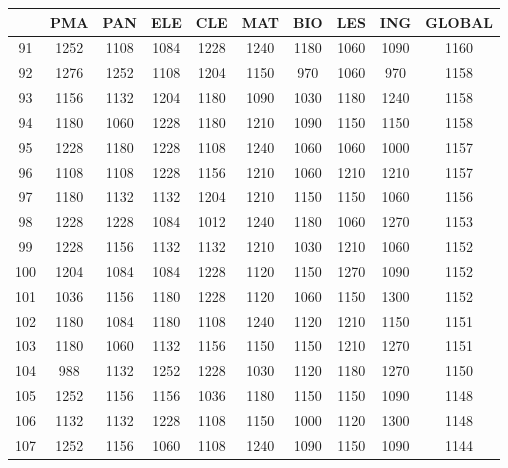 \documentclass{article}
\begin{document}
\begin{table}
\centering
\begin{tabular}{c|c|c|c|c|c|c|c|c|c|}
\cline{2-10}
& \textbf{PMA} & \textbf{PAN} & \textbf{ELE} & \textbf{CLE} & \textbf{MAT} & \textbf{BIO} & \textbf{LES} & \textbf{ING} & \textbf{GLOBAL} \\ \hline
\multicolumn{1}{|c|}{91}  & 1252 & 1108 & 1084 & 1228 & 1240 & 1180 & 1060 & 1090 & 1160 \\ \hline
\multicolumn{1}{|c|}{92}  & 1276 & 1252 & 1108 & 1204 & 1150 & 970  & 1060 & 970  & 1158 \\ \hline
\multicolumn{1}{|c|}{93}  & 1156 & 1132 & 1204 & 1180 & 1090 & 1030 & 1180 & 1240 & 1158 \\ \hline
\multicolumn{1}{|c|}{94}  & 1180 & 1060 & 1228 & 1180 & 1210 & 1090 & 1150 & 1150 & 1158 \\ \hline
\multicolumn{1}{|c|}{95}  & 1228 & 1180 & 1228 & 1108 & 1240 & 1060 & 1060 & 1000 & 1157 \\ \hline
\multicolumn{1}{|c|}{96}  & 1108 & 1108 & 1228 & 1156 & 1210 & 1060 & 1210 & 1210 & 1157 \\ \hline
\multicolumn{1}{|c|}{97}  & 1180 & 1132 & 1132 & 1204 & 1210 & 1150 & 1150 & 1060 & 1156 \\ \hline
\multicolumn{1}{|c|}{98}  & 1228 & 1228 & 1084 & 1012 & 1240 & 1180 & 1060 & 1270 & 1153 \\ \hline
\multicolumn{1}{|c|}{99}  & 1228 & 1156 & 1132 & 1132 & 1210 & 1030 & 1210 & 1060 & 1152 \\ \hline
\multicolumn{1}{|c|}{100} & 1204 & 1084 & 1084 & 1228 & 1120 & 1150 & 1270 & 1090 & 1152 \\ \hline
\multicolumn{1}{|c|}{101} & 1036 & 1156 & 1180 & 1228 & 1120 & 1060 & 1150 & 1300 & 1152 \\ \hline
\multicolumn{1}{|c|}{102} & 1180 & 1084 & 1180 & 1108 & 1240 & 1120 & 1210 & 1150 & 1151 \\ \hline
\multicolumn{1}{|c|}{103} & 1180 & 1060 & 1132 & 1156 & 1150 & 1150 & 1210 & 1270 & 1151 \\ \hline
\multicolumn{1}{|c|}{104} & 988  & 1132 & 1252 & 1228 & 1030 & 1120 & 1180 & 1270 & 1150 \\ \hline
\multicolumn{1}{|c|}{105} & 1252 & 1156 & 1156 & 1036 & 1180 & 1150 & 1150 & 1090 & 1148 \\ \hline
\multicolumn{1}{|c|}{106} & 1132 & 1132 & 1228 & 1108 & 1150 & 1000 & 1120 & 1300 & 1148 \\ \hline
\multicolumn{1}{|c|}{107} & 1252 & 1156 & 1060 & 1108 & 1240 & 1090 & 1150 & 1090 & 1144 \\ \hline

\end{tabular}
\end{table}
\end{document}

